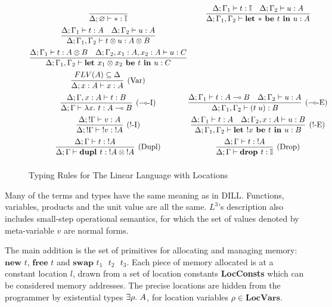 \documentclass[]{unswthesis}
\let\emptyset\varnothing
\newcommand{\Exists}[1]{\exists #1 \ldotp \,}
\newcommand{\lam}[1]{\lambda #1 \ldotp \,}
\newcommand{\app}[2]{(#1 \; #2)}
\newcommand{\lolly}{\multimap}
\newcommand{\types}{\vdash}
\newcommand{\letbe}[3]{\textbf{let $#1$ be $#2$ in $#3$}}
\newcommand{\dupl}[1]{\textbf{dupl $#1$}}
\newcommand{\drop}[1]{\textbf{drop $#1$}}
\newcommand{\lnew}[1]{\textbf{new $#1$}}
\newcommand{\lfree}[1]{\textbf{free $#1$}}
\newcommand{\lswap}[3]{\textbf{swap $#1$ $#2$ $#3$}}
\let\b\textbf
\let\t\text
\begin{document}
\begin{figure}[h]
\caption{Typing Rules for The Linear Language with Locations}
\label{l3_typing}
\begin{displaymath}
\arraycolsep=1.2pt\def\arraystretch{2.2}
\begin{array}{cc}
\infer{\Delta; \emptyset \types * : \mathbb{I}}{} &
\infer{\Delta; \Gamma_1, \Gamma_2 \types \letbe{*}{t}{u} : A}{
  \Delta; \Gamma_1 \types t : \mathbb{I}  &  \Delta; \Gamma_2 \types u : A
} \\
\infer{\Delta; \Gamma_1, \Gamma_2 \types t \otimes u : A \otimes B}{
  \Delta; \Gamma_1 \types t : A  &  \Delta; \Gamma_2 \types u : A
}\\
\infer
{\Delta; \Gamma_1, \Gamma_2 \types \letbe{x_1 \otimes x_2}{t}{u} : C}
{\Delta; \Gamma_1 \types t : A \otimes B  &
 \Delta; \Gamma_2, x_1 : A, x_2 : A \types u : C}\\
\infer[\t{(Var)}]{\Delta; x : A \types x : A}{FLV(A) \subseteq \Delta}\\
\infer[\t{($\lolly$-I)}]{\Delta; \Gamma \types \lam{x} t : A \lolly B}{
  \Delta; \Gamma, x : A \types t : B
} &
\infer[\t{($\lolly$-E)}]{\Delta; \Gamma_1, \Gamma_2 \types \app{t}{u} : B}{
  \Delta; \Gamma_1 \types t : A \lolly B  &  \Delta; \Gamma_2 \types u : A
} \\
\infer[\t{(!-I)}]{\Delta; !\Gamma \types {!v} : {!A}}{\Delta; !\Gamma \types v : A} &
\infer[\t{(!-E)}]{\Delta; \Gamma_1, \Gamma_2 \types \letbe{!x}{t}{u} : B}{
  \Delta; \Gamma_1 \types t : A  &  \Delta; \Gamma_2, x : A \types u : B
}\\
\infer[\t{(Dupl)}]{\Delta; \Gamma \types \dupl{t} : {!A} \otimes {!A}}{
  \Delta; \Gamma \types t : {!A}
} &
\infer[\t{(Drop)}]{\Delta; \Gamma \types \drop{t} : \mathbb{I}}{
  \Delta; \Gamma \types t : {!A}
}
\end{array}
\end{displaymath}
\end{figure}

Many of the terms and types have the same meaning as in DILL. Functions, variables, products and the unit value are all the same. $L^3$'s description also includes small-step operational semantics, for which the set of values denoted by meta-variable $v$ are normal forms.


The main addition is the set of primitives for allocating and managing memory: $\lnew{t}$, $\lfree{t}$ and $\lswap{t_1}{t_2}{t_3}$. Each piece of memory allocated is at a constant location $l$, drawn from a set of location constants \b{LocConsts} which can be considered memory addresses. The precise locations are hidden from the programmer by existential types $\Exists{\rho} A$, for location variables $\rho \in \b{LocVars}$.
\end{document}
